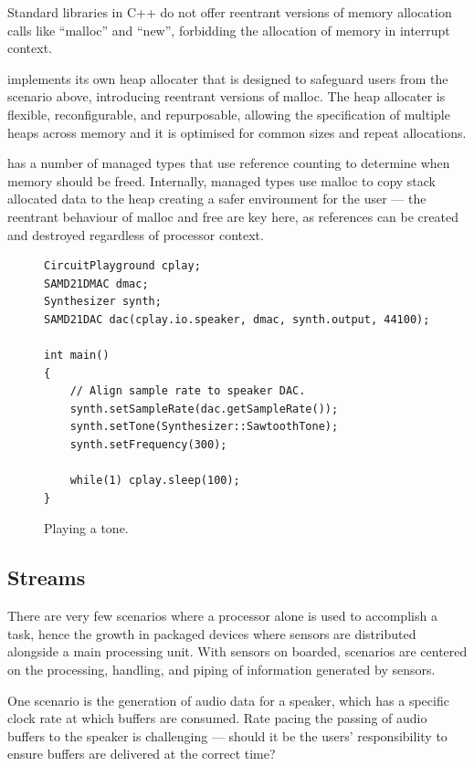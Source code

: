 Standard libraries in C++ do not offer reentrant versions of memory allocation calls like ``malloc'' and ``new'', forbidding the allocation of memory in interrupt context.

\CO implements its own heap allocater that is designed to safeguard users from the scenario above, introducing reentrant versions of malloc. The heap allocater is flexible, reconfigurable, and repurposable, allowing the specification of multiple heaps across memory and it is optimised for common sizes and repeat allocations.

\CO has a number of managed types that use reference counting to determine when memory should be freed. Internally, managed types use malloc to copy stack allocated data to the heap creating a safer environment for the user --- the reentrant behaviour of malloc and free are key here, as references can be created and destroyed regardless of processor context.

\begin{figure}
\begin{lstlisting}
CircuitPlayground cplay;
SAMD21DMAC dmac;
Synthesizer synth;
SAMD21DAC dac(cplay.io.speaker, dmac, synth.output, 44100);

int main()
{
    // Align sample rate to speaker DAC.
    synth.setSampleRate(dac.getSampleRate());
    synth.setTone(Synthesizer::SawtoothTone);
    synth.setFrequency(300);

    while(1) cplay.sleep(100);
}
\end{lstlisting}
\caption{\label{fig:play}Playing a tone.}
\end{figure}

\subsection{Streams}
There are very few scenarios where a processor alone is used to accomplish a task, hence the growth in packaged devices where sensors are distributed alongside a main processing unit. With sensors on boarded, scenarios are centered on the processing, handling, and piping of information generated by sensors.

One scenario is the generation of audio data for a speaker, which has a specific clock rate at which buffers are consumed. Rate pacing the passing of audio buffers to the speaker is challenging --- should it be the users' responsibility to ensure buffers are delivered at the correct time?

